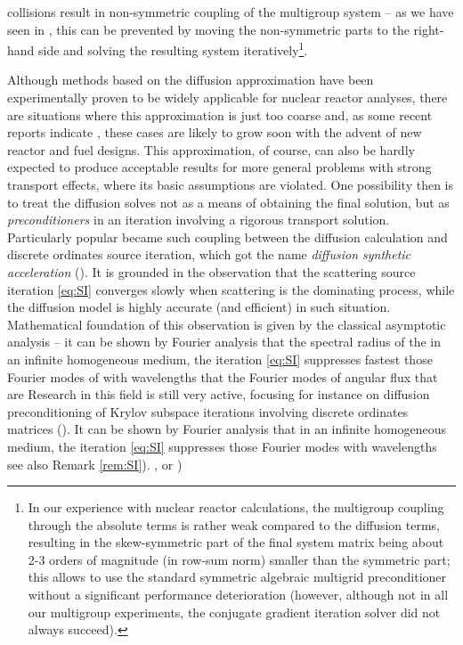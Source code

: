 collisions result in non-symmetric coupling of the multigroup system -- as we have seen in , this can be
prevented by moving the non-symmetric parts to the right-hand side and solving the resulting system
iteratively\footnote{In our experience with nuclear reactor calculations, the multigroup coupling through the absolute
terms is rather weak compared to the diffusion terms, resulting in the skew-symmetric part of the final system matrix
being about 2-3 orders of magnitude (in row-sum norm) smaller than the symmetric part; this allows to use the
standard symmetric algebraic multigrid preconditioner without a significant performance deterioration (however,
although not in all our multigroup experiments, the conjugate gradient iteration solver did not always succeed).}.

Although methods based on the diffusion approximation have been experimentally proven to be widely applicable for
nuclear reactor analyses, there are situations where this approximation is just too coarse and, as some recent reports
indicate \cite{Hejzlar1,Cho1}, these cases are likely to grow soon with the advent of new reactor and fuel designs. This
approximation, of course, can also be hardly expected to produce acceptable results for more general problems with
strong transport effects, where its basic assumptions are violated. One possibility then is to treat the diffusion
solves not as a means of obtaining the final solution, but as \textit{preconditioners} in an iteration involving a
rigorous transport solution. Particularly popular became such coupling between the diffusion calculation and discrete
ordinates source iteration, which got the name \textit{diffusion synthetic acceleration} (\cite{Alcouffe1}). It is
grounded in the observation that the scattering source iteration \eqref{eq:SI} converges slowly when scattering is the
dominating process, while the diffusion model is highly accurate (and efficient) in such situation. Mathematical
foundation of this observation is given by the classical asymptotic analysis -- it can be shown by Fourier analysis that
the spectral radius of the in an infinite homogeneous medium, the iteration \eqref{eq:SI} suppresses fastest those
Fourier modes of with wavelengths that the Fourier modes of angular flux  that are  Research in this field is still very active, focusing for instance on diffusion
preconditioning of Krylov subspace iterations involving discrete ordinates matrices (\cite[Chap.
1]{Azmy1}).
It can be shown by Fourier analysis that in an infinite homogeneous medium, the iteration \eqref{eq:SI} suppresses those
Fourier modes with wavelengths  see also Remark \ref{rem:SI}).
\cite[Chap. 1]{Azmy1}, or \cite[Sec. III]{Adams})

